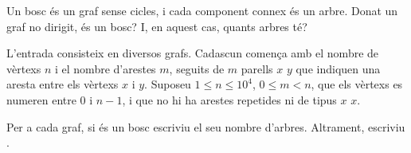

\Statement

Un bosc és un graf sense cicles,
i cada component connex és un arbre.
Donat un graf no dirigit, és un bosc?
I, en aquest cas, quants arbres té?


\Input

L'entrada consisteix en diversos grafs.
Cadascun comença amb el nombre de vèrtexs $n$ i el nombre d'arestes $m$,
seguits de $m$ parells $x$ $y$ que indiquen una aresta entre els vèrtexs $x$ i $y$.
Suposeu $1 \le n \le 10^4$, $0 \le m < n$,
que els vèrtexs es numeren entre 0 i $n-1$,
i que no hi ha arestes repetides ni de tipus $x$ $x$.


\Output

Per a cada graf,
si és un bosc escriviu el seu nombre d'arbres.
Altrament, escriviu .


\SampleOneCol
